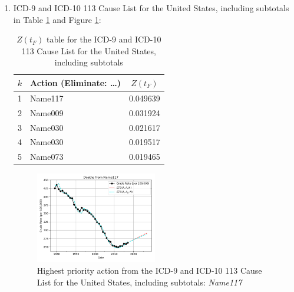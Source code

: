 \documentclass[10pt, a4paper, twocolumn]{IEEEconf}
\begin{document}
\begin{enumerate}
  \item ICD-9 and ICD-10 113 Cause List for the United States, including subtotals in Table \ref{table:ztable2} and Figure \ref{fig:k2}:
    \begin{table}[H]
      \centering
      \begin{tabular}{clc}
        \toprule
          $k$ & Action (Eliminate: \ldots) & $Z(t_F)$ \\
        \midrule
          1   & Name117 & 0.049639 \\
          2   & Name009 & 0.031924 \\
          3   & Name030 & 0.021617 \\
          4   & Name030 & 0.019517 \\
          5   & Name073 & 0.019465 \\
      \end{tabular}
      \caption{$Z(t_F)$ table for the ICD-9 and ICD-10 113 Cause List for the United States, including subtotals}
      \label{table:ztable2}
    \end{table}
    \begin{figure}[H]
      \centering
      \includegraphics[width=0.5\textwidth]{results/US_ICD_113_SELECTED_CAUSES_ALL/Name117_ets.png}
      \caption{Highest priority action from the ICD-9 and ICD-10 113 Cause List for the United States, including subtotals: \textit{Name117}}\label{fig:k2}
    \end{figure}


\end{enumerate}
\end{document}
